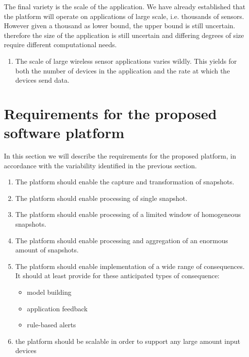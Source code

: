 The final variety is the scale of the application. We have already established that the platform will operate on applications of large scale, i.e. thousands of sensors. However given a thousand as lower bound, the upper bound is still uncertain. therefore the size of the application is still uncertain and differing degrees of size require different computational needs.
\begin{enumerate}[label=V\archid .\arabic* , resume]
\nospace
\item \label{v:scale} The scale of large wireless sensor applications varies wildly. This yields for both the number of devices in the application and the rate at which the devices send data.
\end{enumerate}
\section{Requirements for the proposed software platform}
In this section we will describe the requirements for the proposed platform, in accordance with the variability identified in the previous section. 
\begin{enumerate}[label=R\archid .\arabic*]
\nospace
\item \label{r:snaptshot_transformation} The platform should enable the capture and transformation of snapshots.
\item \label{r:basis_single} The platform should enable processing of single snapshot.
\item \label{r:basis_historic} The platform should enable processing of a limited window of homogeneous snapshots.
\item \label{r:basis_accumulated} The platform should enable processing and aggregation of an enormous amount of snapshots.
\item \label{r:consequence} The platform should enable implementation of a wide range of consequences. It should at least provide for these anticipated types of consequence:
\begin{itemize}
\nospace
\item model building
\item application feedback
\item rule-based alerts
\end{itemize}
\item \label{r:scale} the platform should be scalable in order to support any large amount input devices
\end{enumerate}


